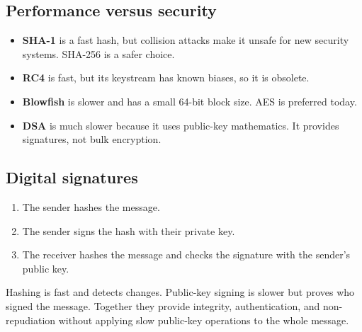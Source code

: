         \subsection{Performance versus security}

            \begin{itemize}
                \item \textbf{SHA-1} is a fast hash, but collision attacks make it unsafe for
                    new security systems. SHA-256 is a safer choice.
                \item \textbf{RC4} is fast, but its keystream has known biases, so it is obsolete.
                \item \textbf{Blowfish} is slower and has a small 64-bit block size. AES is
                    preferred today.
                \item \textbf{DSA} is much slower because it uses public-key mathematics. It
                    provides signatures, not bulk encryption.
            \end{itemize}

        \subsection{Digital signatures}

            \begin{enumerate}
                \item The sender hashes the message.
                \item The sender signs the hash with their private key.
                \item The receiver hashes the message and checks the signature with the
                    sender's public key.
            \end{enumerate}

            Hashing is fast and detects changes. Public-key signing is slower but proves who
            signed the message. Together they provide integrity, authentication, and
            non-repudiation without applying slow public-key operations to the whole message.


